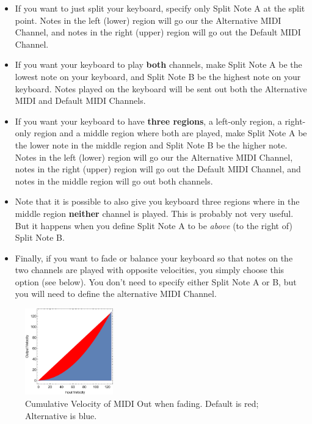 \documentclass{article}
\begin{document}
\begin{itemize}
\item  If you want to just split your keyboard, specify only Split Note A at the split point.  Notes in the left (lower) region will go our the Alternative MIDI Channel, and notes in the right (upper) region will go out the Default MIDI Channel.

\item If you want your keyboard to play {\bf both} channels, make Split Note A be the lowest note on your keyboard, and Split Note B be the highest note on your keyboard.    Notes played on the keyboard will be sent out both the Alternative MIDI and Default MIDI Channels. 

\item If you want your keyboard to have {\bf three regions}, a left-only region, a right-only region and a middle region where both are played, make Split Note A be the lower note in the middle region and Split Note B be the higher note.   Notes in the left (lower) region will go our the Alternative MIDI Channel, notes in the right (upper) region will go out the Default MIDI Channel, and notes in the middle region will go out both channels.

\item Note that it is possible to also give you keyboard three regions where in the middle region {\bf neither} channel is played.  This is probably not very useful.  But it happens when you define Split Note A to be {\it above} (to the right of) Split Note B.

\item Finally, if you want to fade or balance your keyboard so that notes on the two channels are played with opposite velocities, you simply choose this option (see below).  You don't need to specify either Split Note A or B, but you will need to define the alternative MIDI Channel.
\end{itemize}

\begin{figure}
\vspace{-3em}\includegraphics[width=1.5in]{Fade}
\vspace{-2em}\caption{\small Cumulative Velocity of MIDI Out when fading.  Default is {\color{red}red}; Alternative is {\color{blue} blue}.}
\vspace{-3em}
\label{splitter}
\end{figure}
\end{document}
